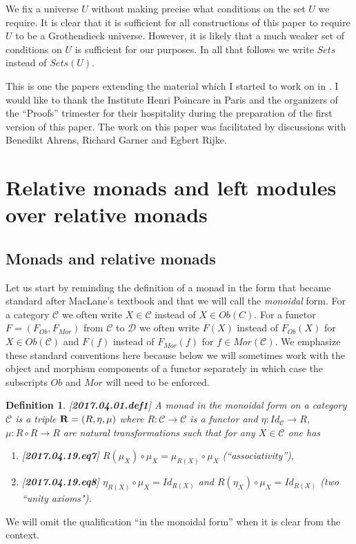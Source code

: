 \documentclass[12pt]{amsart}
\newtheorem{definition}[proposition]{Definition}
\newcommand{\llabel}[1]{\label{#1}[{\bf #1}]}
\newcommand{\sr}{\rightarrow}
\newcommand{\wh}{\widehat}
\newcommand{\R}{{\bf R}}
\newcommand{\C}{{\mathcal C}}
\newcommand{\D}{{\mathcal D}}
\begin{document}
We fix a universe $U$ without making precise what conditions on the set $U$ we require. It is clear that it is sufficient for all constructions of this paper to require $U$ to be a Grothendieck universe. However, it is likely that a much weaker set of conditions on $U$ is sufficient for our purposes. In all that follows we write $Sets$ instead of $Sets(U)$.  

This is one the papers extending the material which I started to work on in \cite{NTS}. I would like to thank the Institute Henri Poincare in Paris and the organizers of the ``Proofs'' trimester for their hospitality during the preparation of the first version of this paper. The work on this paper was facilitated by discussions with Benedikt Ahrens, Richard Garner and Egbert Rijke.  



\section{Relative monads and left modules over relative monads}

\subsection{Monads and relative monads} 

Let us start by reminding the definition of a monad in the form that became standard after MacLane's textbook \cite[p.133]{MacLane} and that we will call the {\em monoidal} form. For a category $\C$ we often write $X\in\C$ instead of $X\in Ob(C)$. For a functor $F=(F_{Ob},F_{Mor})$ from $\C$ to $\D$ we often write $F(X)$ instead of $F_{Ob}(X)$ for $X\in Ob(\C)$ and $F(f)$ instead of $F_{Mor}(f)$ for $f\in Mor(\C)$.  We emphasize these standard conventions here because below we will sometimes work with the object and morphism components of a functor separately in which case the subscripts $Ob$ and $Mor$ will need to be enforced.  
%
\begin{definition}
\llabel{2017.04.01.def1}
A monad in the monoidal form on a category $\C$ is a triple $\R=(R,\eta,\mu)$ where $R:\C\sr \C$ is a functor and  $\eta:Id_{\C}\sr R$, $\mu:R\circ R\sr R$ are natural transformations such that for any $X\in\C$ one has
%
\begin{enumerate}
\item \llabel{2017.04.19.eq7} $R(\mu_X)\circ \mu_{X}=\mu_{R(X)}\circ \mu_X$ (``associativity''),
\item \llabel{2017.04.19.eq8} $\eta_{R(X)}\circ \mu_X=Id_{R(X)}$ and $R(\eta_X)\circ \mu_X=Id_{R(X)}$ (two ``unity axioms").
\end{enumerate}
\end{definition}
%
We will omit the qualification ``in the monoidal form'' when it is clear from the context. 
\end{document}
